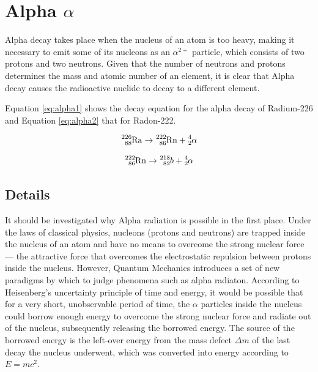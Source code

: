 \pagebreak

\section*{Alpha $\alpha$}

Alpha decay takes place when the nucleus of an atom is too heavy, making it necessary to emit some of its nucleons as an $\alpha^{2+}$ particle, which consists of two protons and two neutrons. Given that the number of neutrons and protons determines the mass and atomic number of an element, it is clear that Alpha decay causes the radioactive nuclide to decay to a different element.

Equation \ref{eq:alpha1} shows the decay equation for the alpha decay of Radium-226 and Equation \ref{eq:alpha2} that for Radon-222.

\begin{equation}
  \ce{^{226}_{88}Ra} \rightarrow \ce{^{222}_{86}Rn} + \ce{^{4}_{2}\alpha}
  \label{eq:alpha1}
\end{equation}

\begin{equation}
  \ce{^{222}_{86}Rn} \rightarrow \ce{^{218}_{82}{b}} + \ce{^{4}_{2}\alpha}
  \label{eq:alpha2}
\end{equation}

\subsection*{Details}

It should be investigated why Alpha radiation is possible in the first place. Under the laws of classical physics, nucleons (protons and neutrons) are trapped inside the nucleus of an atom and have no means to overcome the strong nuclear force --- the attractive force that overcomes the electrostatic repulsion between protons inside the nucleus. However, Quantum Mechanics introduces a set of new paradigms by which to judge phenomena such as alpha radiaton. According to Heisenberg's uncertainty principle of time and energy, it would be possible that for a very short, unobservable period of time, the $\alpha$ particles inside the nucleus could borrow enough energy to overcome the strong nuclear force and radiate out of the nucleus, subsequently releasing the borrowed energy. The source of the borrowed energy is the left-over energy from the mass defect $\Delta m$ of the last decay the nucleus underwent, which was converted into energy according to $E = mc^2$. 


